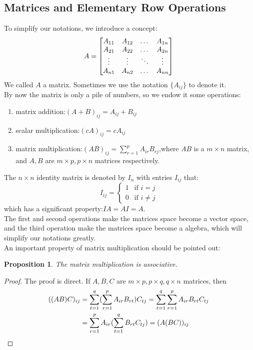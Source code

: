 \documentclass{article}
\begin{document}
\subsection{Matrices and Elementary Row Operations}
\noindent To simplify our notations, we introduce a concept:
\[A=\begin{bmatrix}
	A_{11}&A_{12}&$\ldots$&A_{1n}\\
	A_{21}&A_{22}&$\ldots$&A_{2n}\\
	\vdots&\vdots&\ddots&\vdots\\
	A_{n1}&A_{n2}&$\ldots$&A_{nn}
\end{bmatrix}\]
We called $A$ a matrix. Sometimes we use the notation $\{A_{ij}\}$ to denote it.\\
\indent By now the matrix is only a pile of numbers, so we endow it some operations:
\begin{enumerate}
	\item matrix addition:$(A+B)_{ij}=A_{ij}+B_{ij}$
	\item scalar multiplication:$(cA)_{ij}=cA_{ij}$
	\item matrix multiplication:$(AB)_{ij}=\sum\limits_{r=1}^pA_{ir}B_{rj}$,where $AB$ is a $m\times n$ matrix, and $A,B$ are $m\times p,p\times n$ matrices respectively. 
\end{enumerate}
The $n\times n$ identity matrix is denoted by $I_n$ with entries $I_{ij}$ that:
\[I_{ij}=
\begin{cases}
	1&\text{if }i=j\\
	0&\text{if }i\neq j
\end{cases}\]
which has a significant property:$IA=AI=A$.\\
\indent The first and second operations make the matrices space become a vector space, and the third operation make the matrices space become a algebra, which will simplify our notations greatly.\\
\indent An important property of matrix multiplication should be pointed out:
\theoremstyle{plain}\newtheorem{pro}{Proposition}[section]
\begin{pro}
	The matrix multiplication is associative.
\end{pro}
\begin{proof}
	The proof is direct. If $A,B,C$ are $m\times p,p\times q,q\times n$ matrices, then
	\begin{align}
		((AB)C)_{ij}&=\sum\limits_{t=1}^q(\sum\limits_{r=1}^pA_{ir}B_{rt})C_{tj}=\sum\limits_{t=1}^q\sum\limits_{r=1}^pA_{ir}B_{rt}C_{tj}\notag\\
		&=\sum\limits_{r=1}^pA_{ir}(\sum\limits_{t=1}^qB_{rt}C_{tj})=(A(BC))_{ij}\notag
	\end{align}
\end{proof}
\end{document}
